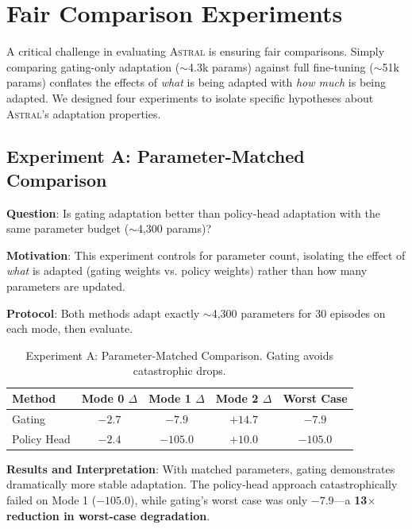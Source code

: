 \documentclass{article}
\newcommand{\astral}{\textsc{Astral}}
\newcommand{\method}{\astral}
\begin{document}
\section{Fair Comparison Experiments}
\label{sec:fair_comparison}

A critical challenge in evaluating \method{} is ensuring fair comparisons. Simply comparing gating-only adaptation ($\sim$4.3k params) against full fine-tuning ($\sim$51k params) conflates the effects of \emph{what} is being adapted with \emph{how much} is being adapted. We designed four experiments to isolate specific hypotheses about \method{}'s adaptation properties.

\subsection{Experiment A: Parameter-Matched Comparison}

\textbf{Question}: Is gating adaptation better than policy-head adaptation with the same parameter budget ($\sim$4,300 params)?

\textbf{Motivation}: This experiment controls for parameter count, isolating the effect of \emph{what} is adapted (gating weights vs. policy weights) rather than how many parameters are updated.

\textbf{Protocol}: Both methods adapt exactly $\sim$4,300 parameters for 30 episodes on each mode, then evaluate.

\begin{table}[h]
\centering
\caption{Experiment A: Parameter-Matched Comparison. Gating avoids catastrophic drops.}
\label{tab:exp_a}
\begin{tabular}{@{}lcccc@{}}
\toprule
\textbf{Method} & \textbf{Mode 0 $\Delta$} & \textbf{Mode 1 $\Delta$} & \textbf{Mode 2 $\Delta$} & \textbf{Worst Case} \\
\midrule
Gating & $-2.7$ & $-7.9$ & $+14.7$ & $-7.9$ \\
Policy Head & $-2.4$ & $-105.0$ & $+10.0$ & $-105.0$ \\
\bottomrule
\end{tabular}
\end{table}

\textbf{Results and Interpretation}: With matched parameters, gating demonstrates dramatically more stable adaptation. The policy-head approach catastrophically failed on Mode 1 ($-105.0$), while gating's worst case was only $-7.9$---a \textbf{13$\times$ reduction in worst-case degradation}.
\end{document}
